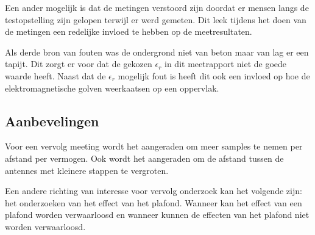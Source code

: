Een ander mogelijk is dat de metingen verstoord zijn doordat er mensen langs de testopstelling zijn gelopen terwijl er werd gemeten. Dit leek tijdens het doen van de metingen een redelijke invloed te hebben op de meetresultaten.

Als derde bron van fouten was de ondergrond niet van beton maar van lag er een tapijt. Dit zorgt er voor dat de gekozen $\epsilon_r$ in dit meetrapport niet de goede waarde heeft. Naast dat de $\epsilon_r$ mogelijk fout is heeft dit ook een invloed op hoe de elektromagnetische golven weerkaatsen op een oppervlak. 

\subsection{Aanbevelingen}
Voor een vervolg meeting wordt het aangeraden om meer samples te nemen per afstand per vermogen. Ook wordt het aangeraden om de afstand tussen de antennes met kleinere stappen te vergroten.

Een andere richting van interesse voor vervolg onderzoek kan het volgende zijn: het onderzoeken van het effect van het plafond. Wanneer kan het effect van een plafond worden verwaarloosd en wanneer kunnen de effecten van het plafond niet worden verwaarloosd.